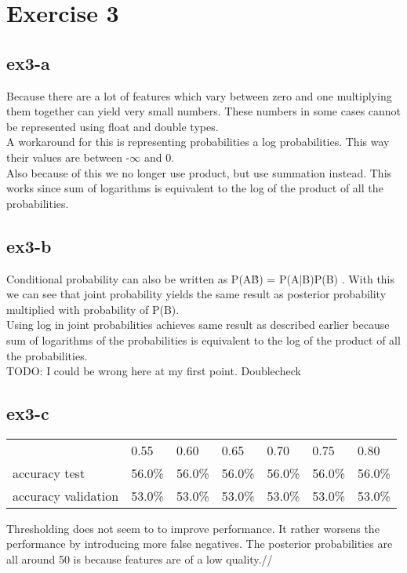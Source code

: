 \section{Exercise 3}
\subsection{ex3-a}
Because there are a lot of features which vary between zero and one multiplying them together can yield very small
numbers. These numbers in some cases cannot be represented using float and double types.\\
A workaround for this is representing probabilities a log probabilities. This way their values are between -$\infty$ and 0.\\
Also because of this we no longer use product, but use summation instead. This works since sum of logarithms is
equivalent to the log of the product of all the probabilities.

\subsection{ex3-b}
Conditional probability can also be written as P(A\^B) = P(A|B)P(B) . With this we can see that joint probability yields
the same result as posterior probability multiplied with probability of P(B). \\
Using log in joint probabilities achieves same result as described earlier because sum of logarithms of the
probabilities is equivalent to the log of the product of all the probabilities.
\\
TODO: I could be wrong here at my first point. Doublecheck

\subsection{ex3-c}
\begin{table}[]
\begin{tabular}{l|llllll}
                    & 0.55   & 0.60   & 0.65   & 0.70   & 0.75   & 0.80   \\ \cline{2-7}
accuracy test       & 56.0\% & 56.0\% & 56.0\% & 56.0\% & 56.0\% & 56.0\% \\ \cline{2-7}
accuracy validation & 53.0\% & 53.0\% & 53.0\% & 53.0\% & 53.0\% & 53.0\%
\end{tabular}
\end{table}
Thresholding does not seem to to improve performance. It rather worsens the performance by introducing more false
negatives. The posterior probabilities are all around 50%
is because features are of a low quality.//


